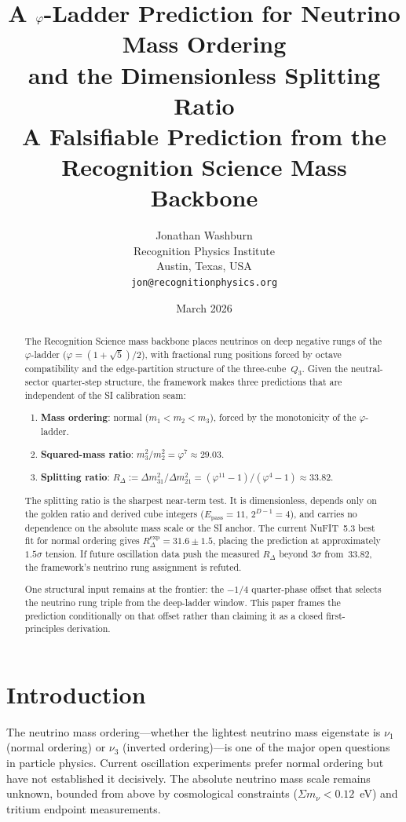 \documentclass[11pt]{article}
\title{A $\phig$-Ladder Prediction for Neutrino Mass Ordering\\
and the Dimensionless Splitting Ratio\\[6pt]
\large A Falsifiable Prediction from the Recognition Science
Mass Backbone}
\author{Jonathan Washburn\\
Recognition Physics Institute\\
Austin, Texas, USA\\
\texttt{jon@recognitionphysics.org}}
\date{March 2026}
\theoremstyle{remark}
\newcommand{\phig}{\varphi}
\newcommand{\Epass}{E_{\mathrm{pass}}}
\newcommand{\Rdel}{R_\Delta}
\begin{document}
\maketitle

\begin{abstract}
The Recognition Science mass backbone places neutrinos on deep
negative rungs of the $\phig$-ladder ($\phig=(1+\sqrt{5})/2$),
with fractional rung positions forced by octave compatibility
and the edge-partition structure of the three-cube~$Q_3$.
Given the neutral-sector quarter-step structure, the framework
makes three predictions that are independent of the SI
calibration seam:
\begin{enumerate}[nosep]
  \item \textbf{Mass ordering}: normal ($m_1<m_2<m_3$), forced
    by the monotonicity of the $\phig$-ladder.
  \item \textbf{Squared-mass ratio}: $m_3^2/m_2^2 = \phig^7
    \approx 29.03$.
  \item \textbf{Splitting ratio}:
    $\Rdel := \Delta m^2_{31}/\Delta m^2_{21}
    = (\phig^{11}-1)/(\phig^4-1) \approx 33.82$.
\end{enumerate}
The splitting ratio is the sharpest near-term test.  It is
dimensionless, depends only on the golden ratio and derived
cube integers ($\Epass=11$, $2^{D-1}=4$), and carries no
dependence on the absolute mass scale or the SI anchor.
The current NuFIT~5.3 best fit for normal ordering gives
$\Rdel^{\mathrm{exp}} = 31.6 \pm 1.5$, placing the prediction
at approximately $1.5\sigma$ tension.  If future oscillation
data push the measured $\Rdel$ beyond $3\sigma$ from~$33.82$,
the framework's neutrino rung assignment is refuted.

One structural input remains at the frontier: the $-1/4$
quarter-phase offset that selects the neutrino rung triple
from the deep-ladder window.  This paper frames the prediction
conditionally on that offset rather than claiming it as a
closed first-principles derivation.
\end{abstract}

\section{Introduction}

The neutrino mass ordering---whether the lightest neutrino
mass eigenstate is $\nu_1$ (normal ordering) or $\nu_3$
(inverted ordering)---is one of the major open questions in
particle physics.  Current oscillation experiments prefer
normal ordering but have not established it decisively.
The absolute neutrino mass scale remains unknown, bounded
from above by cosmological constraints ($\Sigma m_\nu < 0.12$~eV)
and tritium endpoint measurements.
\end{document}
